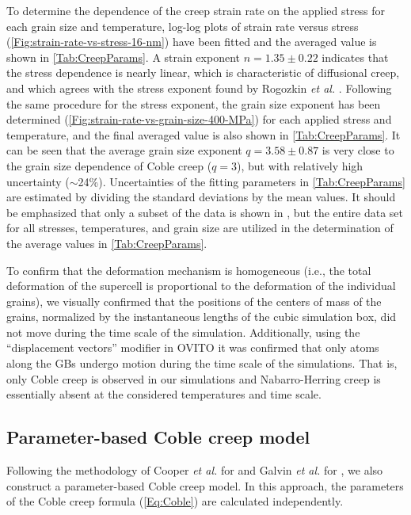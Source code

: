 \documentclass[preprint, 12pt]{elsarticle}
\newcommand{\?}{\stackrel{?}{=}}
\begin{document}
To determine the dependence of the creep strain rate on the applied stress for each grain size and temperature, log-log plots of strain rate versus stress (\cref{Fig:strain-rate-vs-stress-16-nm}) have been fitted and the averaged value is shown in \cref{Tab:CreepParams}. A strain exponent $n = 1.35 \pm 0.22$ indicates that the stress dependence is nearly linear, which is characteristic of diffusional creep, and which agrees with the stress exponent found by Rogozkin \textit{et al.} \cite{Rogozkin2003}. Following the same procedure for the stress exponent, the grain size exponent has been determined (\cref{Fig:strain-rate-vs-grain-size-400-MPa}) for each applied stress and temperature, and the final averaged value is also shown in \cref{Tab:CreepParams}. It can be seen that the average grain size exponent $q = 3.58 \pm 0.87$ is very close to the grain size dependence of Coble creep ($q = 3$), but with relatively high uncertainty ($\sim$24\%). Uncertainties of the fitting parameters in \cref{Tab:CreepParams} are estimated by dividing the standard deviations by the mean values. It should be emphasized that only a subset of the data is shown in , but the entire data set for all stresses, temperatures, and grain size are utilized in the determination of the average values in \cref{Tab:CreepParams}.

To confirm that the deformation mechanism is homogeneous (i.e., the total deformation of the supercell is proportional to the deformation of the individual grains), we visually confirmed that the positions of the centers of mass of the grains, normalized by the instantaneous lengths of the cubic simulation box, did not move during the time scale of the simulation. Additionally, using the ``displacement vectors'' modifier in OVITO \cite{Stukowski2010} it was confirmed that only atoms along the GBs undergo motion during the time scale of the simulations. That is, only Coble creep is observed in our simulations and Nabarro-Herring creep is essentially absent at the considered temperatures and time scale.

\subsection{Parameter-based Coble creep model}
\label{Sec:ParameterBased}

Following the methodology of Cooper \textit{et al.} \cite{Cooper2021} for  and Galvin \textit{et al.} \cite{Galvin2024b} for , we also construct a parameter-based Coble creep model. In this approach, the parameters of the Coble creep formula (\cref{Eq:Coble}) are calculated independently. 
\end{document}

